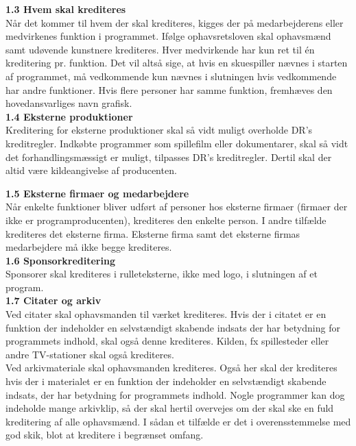 \textbf{1.3 Hvem skal krediteres} \\
Når det kommer til hvem der skal krediteres, kigges der på medarbejderens eller medvirkenes funktion i programmet. Ifølge ophavsretsloven skal ophavsmænd samt udøvende kunstnere krediteres.
Hver medvirkende har kun ret til én kreditering pr. funktion. Det vil altså sige, at hvis en skuespiller nævnes i starten af programmet, må vedkommende kun nævnes i slutningen hvis vedkommende har andre funktioner.
Hvis flere personer har samme funktion, fremhæves den hovedansvarliges navn grafisk. \\

\textbf{1.4 Eksterne produktioner} \\
Kreditering for eksterne produktioner skal så vidt muligt overholde DR's kreditregler. Indkøbte programmer som spillefilm eller dokumentarer, skal så vidt det forhandlingsmæssigt er muligt, tilpasses DR's kreditregler. Dertil skal der altid være kildeangivelse af producenten. 

\textbf{1.5 Eksterne firmaer og medarbejdere} \\
Når enkelte funktioner bliver udført af personer hos eksterne firmaer (firmaer der ikke er programproducenten), krediteres den enkelte person. I andre tilfælde krediteres det eksterne firma. Eksterne firma samt det eksterne firmas medarbejdere må ikke begge krediteres. \\

\textbf{1.6 Sponsorkreditering} \\
Sponsorer skal krediteres i rulleteksterne, ikke med logo, i slutningen af et program. \\

\textbf{1.7 Citater og arkiv} \\
Ved citater skal ophavsmanden til værket krediteres. Hvis der i citatet er en funktion der indeholder en selvstændigt skabende indsats der har betydning for programmets indhold, skal også denne krediteres. Kilden, fx spillesteder eller andre TV-stationer skal også krediteres. \\
Ved arkivmateriale skal ophavsmanden krediteres. Også her skal der krediteres hvis der i materialet er en funktion der indeholder en selvstændigt skabende indsats, der har betydning for programmets indhold. Nogle programmer kan dog indeholde mange arkivklip, så der skal hertil overvejes om der skal ske en fuld kreditering af alle ophavsmænd. I sådan et tilfælde er det i overensstemmelse med god skik, blot at kreditere i begrænset omfang. \\

